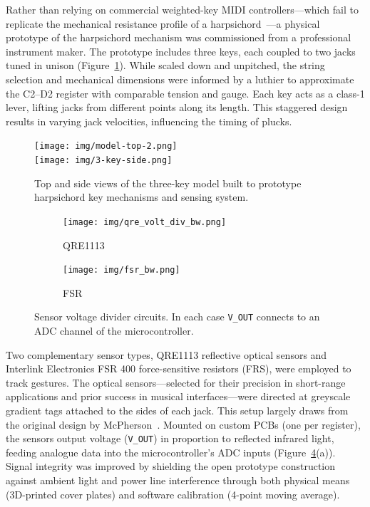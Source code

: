 Rather than relying on commercial weighted-key MIDI controllers—which fail to replicate the mechanical resistance profile of a harpsichord~\cite{mcalpine2014sampling}—a physical prototype of the harpsichord mechanism was commissioned from a professional instrument maker. The prototype includes three keys, each coupled to two jacks tuned in unison (Figure~\ref{fig:3-key-model}). While scaled down and unpitched, the string selection and mechanical dimensions were informed by a luthier to approximate the C2–D2 register with comparable tension and gauge. Each key acts as a class-1 lever, lifting jacks from different points along its length. This staggered design results in varying jack velocities, influencing the timing of plucks. 
\begin{figure}
    \centering
    \texttt{[image: img/model-top-2.png]}\\
    \texttt{[image: img/3-key-side.png]}
    \caption{Top and side views of the three-key model built to prototype harpsichord key mechanisms and sensing system.}
    \label{fig:3-key-model}
\end{figure}
\begin{figure}[t!]
    \centering
    \begin{subfigure}[t]{0.60\linewidth}
        \centering
        \texttt{[image: img/qre\_volt\_div\_bw.png]}
        \caption{QRE1113}
        \label{fig:qre_circuit}
    \end{subfigure}
    \hfill
    \begin{subfigure}[t]{0.21\linewidth}
        \centering
        \texttt{[image: img/fsr\_bw.png]}
        \caption{FSR}
        \label{fig:fsr_circuit}
    \end{subfigure}
    \caption{Sensor voltage divider circuits. In each case \texttt{V\_OUT} connects to an ADC channel of the microcontroller.}
    \label{fig:circuits}
\end{figure}
Two complementary sensor types, QRE1113 reflective optical sensors and Interlink Electronics FSR 400 force-sensitive resistors (FRS), were employed to track gestures. The optical sensors—selected for their precision in short-range applications and prior success in musical interfaces—were directed at greyscale gradient tags attached to the sides of each jack. This setup largely draws from the original design by McPherson~\cite{mcpherson2013piano}. Mounted on custom PCBs (one per register), the sensors output voltage (\texttt{V\_OUT}) in proportion to reflected infrared light, feeding analogue data into the microcontroller’s ADC inputs (Figure~\ref{fig:circuits}(a)). Signal integrity was improved by shielding the open prototype construction against ambient light and power line interference through both physical means (3D-printed cover plates) and software calibration (4-point moving average). 
